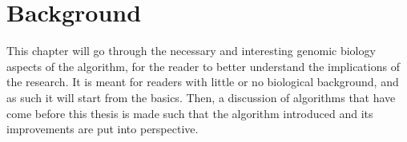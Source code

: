 \chapter{Background}\label{ch:Background}

This chapter will go through the necessary and interesting genomic biology aspects of the algorithm, for the reader to better understand the implications of the research.
It is meant for readers with little or no biological background, and as such it will start from the basics.
Then, a discussion of algorithms that have come before this thesis is made such that the algorithm introduced and its improvements are put into perspective.








